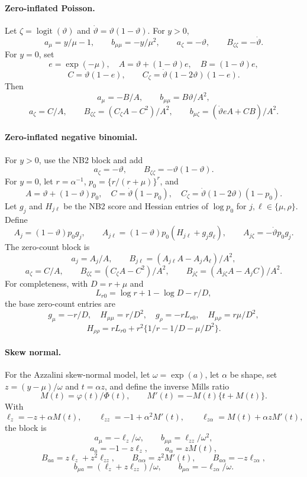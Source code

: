 \documentclass[a4paper,fleqn]{cas-sc}
\begin{document}
\paragraph{Zero-inflated Poisson.}
Let $\zeta=\operatorname{logit}(\vartheta)$ and $\dot\vartheta=\vartheta(1-\vartheta)$. For $y>0$,
\[
 a_\mu=y/\mu-1,\qquad b_{\mu\mu}=-y/\mu^2,\qquad
 a_\zeta=-\vartheta,\qquad B_{\zeta\zeta}=-\dot\vartheta.
\]
For $y=0$, set
\[
 e=\exp(-\mu),\quad A=\vartheta+(1-\vartheta)e,\quad
 B=(1-\vartheta)e,
\]
\[
 C=\dot\vartheta(1-e),\qquad
 C_\zeta=\dot\vartheta(1-2\vartheta)(1-e).
\]
Then
\[
 a_\mu=-B/A,\qquad b_{\mu\mu}=B\vartheta/A^2,
\]
\[
 a_\zeta=C/A,\qquad
 B_{\zeta\zeta}=(C_\zeta A-C^2)/A^2,
 \qquad b_{\mu\zeta}=(\dot\vartheta eA+CB)/A^2.
\]

\paragraph{Zero-inflated negative binomial.}
For $y>0$, use the NB2 block and add
\[
 a_\zeta=-\vartheta,\qquad B_{\zeta\zeta}=-\vartheta(1-\vartheta).
\]
For $y=0$, let $r=\alpha^{-1}$, $p_0=\{r/(r+\mu)\}^r$, and
\[
 A=\vartheta+(1-\vartheta)p_0,\quad
 C=\dot\vartheta(1-p_0),\quad
 C_\zeta=\dot\vartheta(1-2\vartheta)(1-p_0).
\]
Let $g_j$ and $H_{j\ell}$ be the NB2 score and Hessian entries of $\log p_0$ for $j,\ell\in\{\mu,\rho\}$. Define
\[
 A_j=(1-\vartheta)p_0g_j,\qquad
 A_{j\ell}=(1-\vartheta)p_0(H_{j\ell}+g_jg_\ell),
 \qquad A_{j\zeta}=-\dot\vartheta p_0g_j.
\]
The zero-count block is
\[
 a_j=A_j/A,\qquad B_{j\ell}=(A_{j\ell}A-A_jA_\ell)/A^2,
\]
\[
 a_\zeta=C/A,\qquad B_{\zeta\zeta}=(C_\zeta A-C^2)/A^2,
 \qquad B_{j\zeta}=(A_{j\zeta}A-A_jC)/A^2.
\]
For completeness, with $D=r+\mu$ and
\[
 L_{r0}=\log r+1-\log D-r/D,
\]
the base zero-count entries are
\[
 g_\mu=-r/D,\quad H_{\mu\mu}=r/D^2,\quad
 g_\rho=-rL_{r0},\quad H_{\mu\rho}=r\mu/D^2,
\]
\[
 H_{\rho\rho}=rL_{r0}+r^2\{1/r-1/D-\mu/D^2\}.
\]

\paragraph{Skew normal.}
For the Azzalini skew-normal model, let $\omega=\exp(a)$, let $\alpha$ be shape, set $z=(y-\mu)/\omega$ and $t=\alpha z$, and define the inverse Mills ratio
\[
 M(t)=\varphi(t)/\Phi(t),\qquad M'(t)=-M(t)\{t+M(t)\}.
\]
With
\[
 \ell_z=-z+\alpha M(t),\qquad
 \ell_{zz}=-1+\alpha^2M'(t),\qquad
 \ell_{z\alpha}=M(t)+\alpha zM'(t),
\]
the block is
\[
 a_\mu=-\ell_z/\omega,\qquad b_{\mu\mu}=\ell_{zz}/\omega^2,
\]
\[
 a_a=-1-z\ell_z,\qquad a_\alpha=zM(t),
\]
\[
 B_{aa}=z\ell_z+z^2\ell_{zz},\qquad
 B_{\alpha\alpha}=z^2M'(t),\qquad
 B_{a\alpha}=-z\ell_{z\alpha},
\]
\[
 b_{\mu a}=(\ell_z+z\ell_{zz})/\omega,\qquad
 b_{\mu\alpha}=-\ell_{z\alpha}/\omega.
\]
\end{document}
